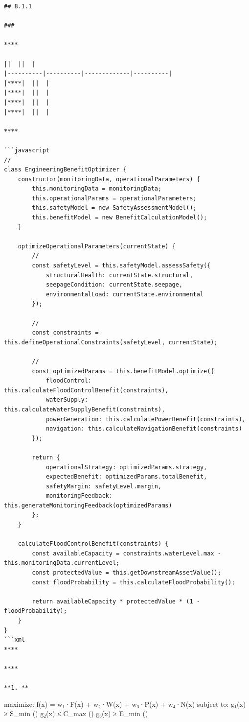 \begin{verbatim}
## 8.1.1 

### 

****

||  ||  |
|----------|----------|-------------|----------|
|****|  ||  |
|****|  ||  |
|****|  ||  |
|****|  ||  |

****

```javascript
// 
class EngineeringBenefitOptimizer {
    constructor(monitoringData, operationalParameters) {
        this.monitoringData = monitoringData;
        this.operationalParams = operationalParameters;
        this.safetyModel = new SafetyAssessmentModel();
        this.benefitModel = new BenefitCalculationModel();
    }
    
    optimizeOperationalParameters(currentState) {
        // 
        const safetyLevel = this.safetyModel.assessSafety({
            structuralHealth: currentState.structural,
            seepageCondition: currentState.seepage,
            environmentalLoad: currentState.environmental
        });
        
        // 
        const constraints = this.defineOperationalConstraints(safetyLevel, currentState);
        
        // 
        const optimizedParams = this.benefitModel.optimize({
            floodControl: this.calculateFloodControlBenefit(constraints),
            waterSupply: this.calculateWaterSupplyBenefit(constraints),
            powerGeneration: this.calculatePowerBenefit(constraints),
            navigation: this.calculateNavigationBenefit(constraints)
        });
        
        return {
            operationalStrategy: optimizedParams.strategy,
            expectedBenefit: optimizedParams.totalBenefit,
            safetyMargin: safetyLevel.margin,
            monitoringFeedback: this.generateMonitoringFeedback(optimizedParams)
        };
    }
    
    calculateFloodControlBenefit(constraints) {
        const availableCapacity = constraints.waterLevel.max - this.monitoringData.currentLevel;
        const protectedValue = this.getDownstreamAssetValue();
        const floodProbability = this.calculateFloodProbability();
        
        return availableCapacity * protectedValue * (1 - floodProbability);
    }
}
```xml
****

****

**1. **
\end{verbatim}

maximize: f(x) = w₁·F(x) + w₂·W(x) + w₃·P(x) + w₄·N(x) subject to: g₁(x)
≥ S\_min () g₂(x) ≤ C\_max () g₃(x) ≥ E\_min ()


